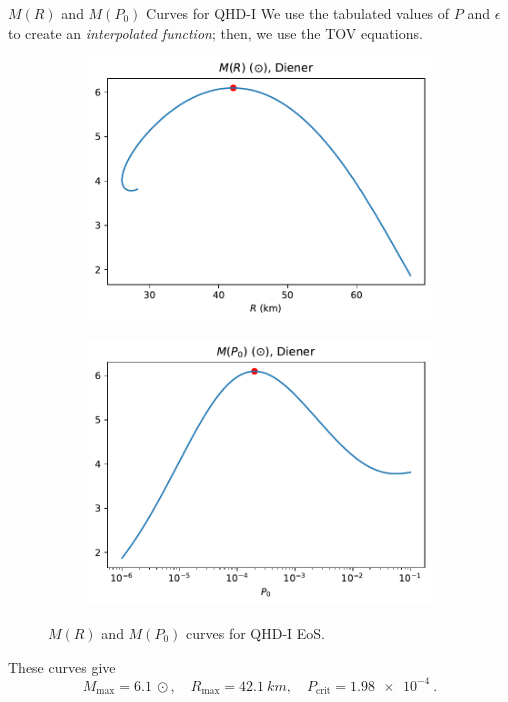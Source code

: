 \documentclass[]{beamer}
\begin{document}
    \begin{frame}{$M(R)$ and $M(P_0)$ Curves for QHD-I}
        We use the tabulated values of $P$ and $\epsilon$ to create an \textit{interpolated function}\pause ; then, we use the TOV equations. \pause
        \begin{figure}[h!]
            \centering
            \begin{subfigure}{.5\textwidth}
                \includegraphics[width = \textwidth]{../paper/images/qhd1/r_analysis.pdf}
            \end{subfigure}%
            \begin{subfigure}{.5\textwidth}
                \includegraphics[width = \textwidth]{../paper/images/qhd1/p0_analysis.pdf}
            \end{subfigure}
            \caption[]{$M(R)$ and $M(P_0)$ curves for QHD-I EoS.}
        \end{figure}\pause
        \vspace{-3pt}
        These curves give \[M_\text{max} = \SI{6.1}{\odot}, \quad R_\text{max} = \SI{42.1}{km}, \quad P_\text{crit} = \SI{1.98e-4}{}.\]
    \end{frame}
\end{document}
